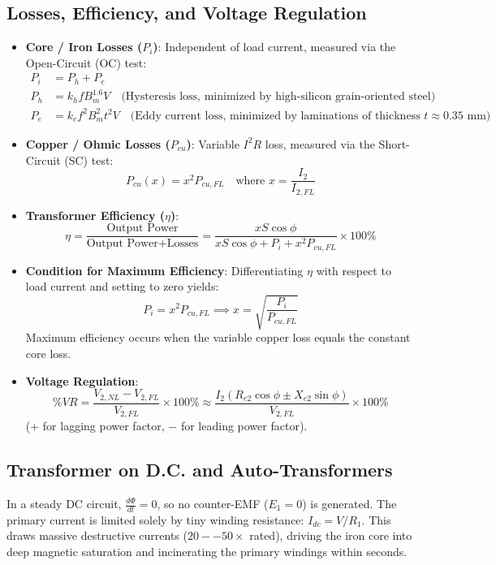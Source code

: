 \subsection{Losses, Efficiency, and Voltage Regulation}
\begin{itemize}[leftmargin=1.5em]
    \item \textbf{Core / Iron Losses ($P_i$)}: Independent of load current, measured via the Open-Circuit (OC) test:
    \begin{align}
        P_i &= P_h + P_e \\
        P_h &= k_h f B_m^{1.6} V \quad \text{(Hysteresis loss, minimized by high-silicon grain-oriented steel)} \\
        P_e &= k_e f^2 B_m^2 t^2 V \quad \text{(Eddy current loss, minimized by laminations of thickness } t \approx 0.35\text{ mm)}
    \end{align}
    \item \textbf{Copper / Ohmic Losses ($P_{cu}$)}: Variable $I^2 R$ loss, measured via the Short-Circuit (SC) test:
    \begin{equation}
    P_{cu}(x) = x^2 P_{cu,FL} \quad \text{where } x = \frac{I_2}{I_{2,FL}}
    \end{equation}
    \item \textbf{Transformer Efficiency ($\eta$)}:
    \begin{equation}
    \eta = \frac{\text{Output Power}}{\text{Output Power} + \text{Losses}} = \frac{x S \cos\phi}{x S \cos\phi + P_i + x^2 P_{cu,FL}} \times 100\%
    \end{equation}
    \item \textbf{Condition for Maximum Efficiency}:
    Differentiating $\eta$ with respect to load current and setting to zero yields:
    \begin{equation}
    P_i = x^2 P_{cu,FL} \implies x = \sqrt{\frac{P_i}{P_{cu,FL}}}
    \end{equation}
    Maximum efficiency occurs when the variable copper loss equals the constant core loss.
    \item \textbf{Voltage Regulation}:
    \begin{equation}
    \%VR = \frac{V_{2,NL} - V_{2,FL}}{V_{2,FL}} \times 100\% \approx \frac{I_2(R_{e2}\cos\phi \pm X_{e2}\sin\phi)}{V_{2,FL}} \times 100\%
    \end{equation}
    ($+$ for lagging power factor, $-$ for leading power factor).
\end{itemize}

\subsection{Transformer on D.C. and Auto-Transformers}
\begin{important}
In a steady DC circuit, $\frac{d\Phi}{dt} = 0$, so no counter-EMF ($E_1 = 0$) is generated. The primary current is limited solely by tiny winding resistance: $I_{dc} = V / R_1$. This draws massive destructive currents ($20--50\times$ rated), driving the iron core into deep magnetic saturation and incinerating the primary windings within seconds.
\end{important}

